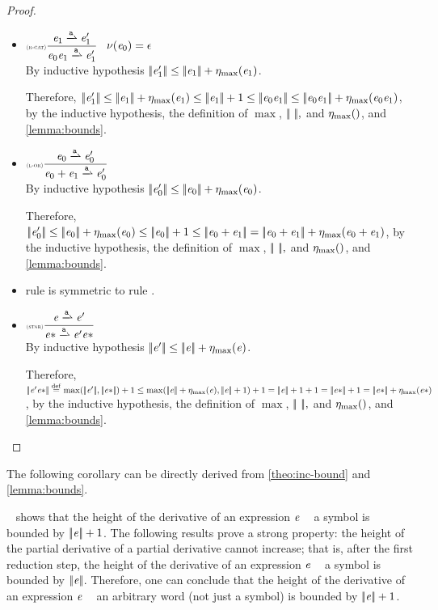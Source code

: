 \begin{proof}
\begin{description}
\begin{itemize}
    \item $\Rule{r-cat}{\re_1\parDer{\sym}\re'_1}{\re_0\catop\re_1\parDer{\sym}\re'_1}{\hasEps{\re_0}=\eps}$\\[2ex]
          By inductive hypothesis ${{\mid\!\mid}}{\mathit {e}_1'}{{\mid\!\mid}}\leq {{\mid\!\mid}}{\ensuremath{\mathit {e}}_1}{{\mid\!\mid}}+{\eta_{\max}}({\mathit {e}_1})$.

          Therefore, $\tsize{\re_1'}\leq \tsize{\re_1}+\incFunSize{\re_1}\leq\tsize{\re_1}+1\leq\tsize{\re_0\catop\re_1}\leq\tsize{\re_0\catop\re_1}+\incFunSize{\re_0\catop\re_1}$, by the inductive hypothesis, the definition of $\max$, ${{\mid\!\mid}}{\ }{{\mid\!\mid}},$ and ${\eta_{\max}}({})$, and \cref{lemma:bounds}.

    \item $\Rule{l-or}{\re_0\parDer{\sym}\re'_0}{\re_0\orop\re_1\parDer{\sym}\re'_0}{}$\\[2ex]
          By inductive hypothesis ${{\mid\!\mid}}{\mathit {e}_0'}{{\mid\!\mid}}\leq {{\mid\!\mid}}{\ensuremath{\mathit {e}}_0}{{\mid\!\mid}}+{\eta_{\max}}({\mathit {e}_0})$.

          Therefore, $\tsize{\re_0'}\leq \tsize{\re_0}+\incFunSize{\re_0}\leq\tsize{\re_0}+1\leq\tsize{\re_0\orop\re_1}=\tsize{\re_0\orop\re_1}+\incFunSize{\re_0\orop\re_1}$, by the inductive hypothesis, the definition of $\max$, ${{\mid\!\mid}}{\ }{{\mid\!\mid}},$ and ${\eta_{\max}}({})$, and \cref{lemma:bounds}.
    \item rule  is symmetric to  rule .
    \item $\Rule{star}{\re\parDer{\sym}\re'}{\starop{\re}\parDer{\sym}\re'\catop\starop{\re}}{}$\\[2ex]
          By inductive hypothesis ${{\mid\!\mid}}{\mathit {e}'}{{\mid\!\mid}}\leq {{\mid\!\mid}}{\ensuremath{\mathit {e}}}{{\mid\!\mid}}+{\eta_{\max}}({\mathit {e}})$.

          Therefore, $\tsize{\re'\catop\starop{\re}}\stackrel{\mathrm{def}}{=}\max(\tsize{\re'},{\tsize{\starop{\re}}})+1\leq \max(\tsize{\re}+\incFunSize{\re},{\tsize{\re}}+1)+1=\tsize{\re}+1+1=\tsize{\starop{\re}}+1=\tsize{\starop{\re}}+\incFunSize{\starop{\re}}$, by the inductive hypothesis, the definition of $\max$, ${{\mid\!\mid}}{\ }{{\mid\!\mid}},$ and ${\eta_{\max}}({})$, and \cref{lemma:bounds}.
   \end{itemize}
 \end{description}
\end{proof}

The following corollary can be directly derived from \cref{theo:inc-bound} and \cref{lemma:bounds}.
~ shows that the height of the derivative of an expression $\mathit {e}$ \wrt~ a symbol is bounded by ${{\mid\!\mid}}{\mathit {e}}{{\mid\!\mid}}+1$.
The following results prove a strong property: the height of the partial derivative of a partial derivative cannot increase; that is, after the first reduction step, the height of the derivative of an expression $\mathit {e}$ \wrt~ a symbol is bounded by ${{\mid\!\mid}}{\mathit {e}}{{\mid\!\mid}}$.
Therefore, one can conclude that the height of the derivative of an expression $\mathit {e}$ \wrt~ an arbitrary  word (not just a symbol) is bounded by ${{\mid\!\mid}}{\mathit {e}}{{\mid\!\mid}}+1$.

